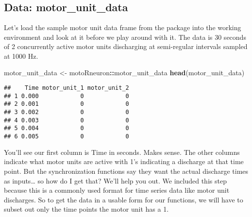 \documentclass[]{article}
\newenvironment{Shaded}{\begin{snugshade}}{\end{snugshade}}
\newcommand{\KeywordTok}[1]{\textcolor[rgb]{0.13,0.29,0.53}{\textbf{#1}}}
\newcommand{\DataTypeTok}[1]{\textcolor[rgb]{0.13,0.29,0.53}{#1}}
\newcommand{\DecValTok}[1]{\textcolor[rgb]{0.00,0.00,0.81}{#1}}
\newcommand{\StringTok}[1]{\textcolor[rgb]{0.31,0.60,0.02}{#1}}
\newcommand{\OperatorTok}[1]{\textcolor[rgb]{0.81,0.36,0.00}{\textbf{#1}}}
\newcommand{\NormalTok}[1]{#1}
\begin{document}
\subsection{Data: motor\_unit\_data}\label{data-motor_unit_data}

Let's load the sample motor unit data frame from the package into the
working environment and look at it before we play around with it. The
data is 30 seconds of 2 concurrently active motor units discharging at
semi-regular intervals sampled at 1000 Hz.

\begin{Shaded}
\begin{Highlighting}[]
\NormalTok{motor_unit_data <-}\StringTok{ }\NormalTok{motoRneuron}\OperatorTok{::}\NormalTok{motor_unit_data}
\KeywordTok{head}\NormalTok{(motor_unit_data)}
\end{Highlighting}
\end{Shaded}

\begin{verbatim}
##    Time motor_unit_1 motor_unit_2
## 1 0.000            0            0
## 2 0.001            0            0
## 3 0.002            0            0
## 4 0.003            0            0
## 5 0.004            0            0
## 6 0.005            0            0
\end{verbatim}

You'll see our first column is Time in seconds. Makes sense. The other
columns indicate what motor units are active with 1's indicating a
discharge at that time point. But the synchronization functions say they
want the actual discharge times as inputs\ldots{} so how do I get that?
We'll help you out. We included this step because this is a commonly
used format for time series data like motor unit discharges. So to get
the data in a usable form for our functions, we will have to subset out
only the time points the motor unit has a 1.

\begin{Shaded}
\end{Shaded}
\end{document}

